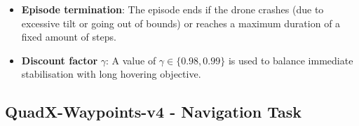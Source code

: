 \documentclass[11pt,a4paper]{article}
\begin{document}
\begin{itemize}
\begin{itemize}
    \item \textbf{Linear Distance Penalty} $\|pos\_error\|$: Euclidean distance between the drone and the fixed hover target at $(0, 0, 1)$\,m thus at 1m from the ground.
    \item \textbf{Angular Tilt Penalty} $\|tilt\_error\|$: Euclidean norm of the roll and pitch angles, encouraging the drone to stay level.
    \item \textbf{Yaw Rate Penalty} $0.01 \cdot \dot{\psi}^2$: Squared yaw rate discourages rapid spinning. Note the quadratic penalty.
    \item \textbf{Base step cost}: Each step starts at $-0.1$ before the $+1.0$ bonus is added, giving a net constant of $0.9$ in the non-terminal case.
    \item \textbf{Terminal Penalty}: Immediately overrides the reward with $-100$ upon crash or leaving the flight dome.
\end{itemize}

\item \textbf{Episode termination}: The episode ends if the drone crashes (due to excessive tilt or going out of bounds) or reaches a maximum duration of a fixed amount of steps.

\item \textbf{Discount factor} $\gamma$: A value of $\gamma \in \{0.98, 0.99\}$ is used to balance immediate stabilisation with long hovering objective.
\end{itemize}

\subsection{QuadX-Waypoints-v4 - Navigation Task}
\end{document}
